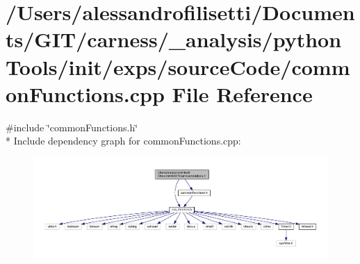 \hypertarget{a00056}{\section{/\-Users/alessandrofilisetti/\-Documents/\-G\-I\-T/carness/\-\_\-analysis/python\-Tools/init/exps/source\-Code/common\-Functions.cpp File Reference}
\label{a00056}
}
{\ttfamily \#include \char`\"{}common\-Functions.\-h\char`\"{}}\\*
Include dependency graph for common\-Functions.\-cpp\-:
\nopagebreak
\begin{figure}[H]
\begin{center}
\leavevmode
\includegraphics[width=350pt]{a00170}
\end{center}
\end{figure}
